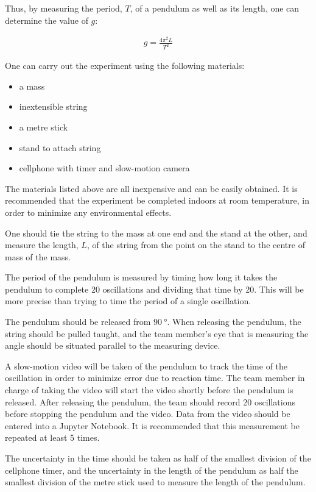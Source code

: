Thus, by measuring the period, $T$, of a pendulum as well as its length, one can determine the value of $g$:

\begin{align*}
g=\frac{4\pi^{2}L}{T^{2}}
\end{align*}

One can carry out the experiment using the following materials:
\begin{itemize}
\item a mass
\item inextensible string
\item a metre stick
\item stand to attach string
\item cellphone with timer and slow-motion camera
\end{itemize}

The materials listed above are all inexpensive and can be easily obtained.  It is recommended that the experiment be completed indoors at room temperature, in order to minimize any environmental effects. 

One should tie the string to the mass at one end and the stand at the other, and measure the length, $L$, of the string from the point on the stand to the centre of mass of the mass.

The period of the pendulum is measured by timing how long it takes the pendulum to complete 20 oscillations and dividing that time by 20. This will be more precise than trying to time the period of a single oscillation.

The pendulum should be released from $\SI{90}{\degree}$. When releasing the pendulum, the string should be pulled taught, and the team member's eye that is measuring the angle should be situated parallel to the measuring device. 

A slow-motion video will be taken of the pendulum to track the time of the oscillation in order to minimize error due to reaction time. The team member in charge of taking the video will start the video shortly before the pendulum is released. After releasing the pendulum, the team should record 20 oscillations before stopping the pendulum and the video. Data from the video should be entered into a Jupyter Notebook. It is recommended that this measurement be repeated at least 5 times.


The uncertainty in the time should be taken as half of the smallest division of the cellphone timer, and the uncertainty in the length of the pendulum as half the smallest division of the metre stick used to measure the length of the pendulum.

